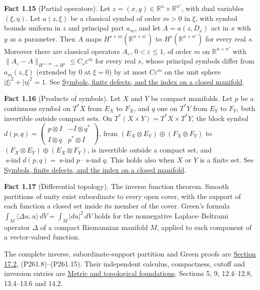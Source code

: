 \documentclass[
  11pt,
]{article}
\begin{document}
\textbf{Fact 1.15} (Partial operators). Let
\(z=(x,y)\in\mathbb R^n\times\mathbb R^{n'}\), with dual variables
\((\xi,\eta)\). Let \(a(z,\xi)\) be a classical symbol of order \(m>0\)
in \(\xi\), with symbol bounds uniform in \(z\) and principal part
\(a_m\), and let \(A=a(z,D_x)\) act in \(x\) with \(y\) as a parameter.
Then \(A\) maps \(H^{s+m}(\mathbb R^{n+n'})\) to
\(H^s(\mathbb R^{n+n'})\) for every real \(s\). Moreover there are
classical operators \(A_\varepsilon\), \(0<\varepsilon\le1\), of order
\(m\) on \(\mathbb R^{n+n'}\) with
\(\|A_\varepsilon-A\|_{H^{s+m}\to H^s}\le C_s\varepsilon^m\) for every
real \(s\), whose principal symbols differ from \(a_m(z,\xi)\) (extended
by \(0\) at \(\xi=0\)) by at most \(C\varepsilon^m\) on the unit sphere
\(|\xi|^2+|\eta|^2=1\). See
\href{global-elliptic-symbol-index.pdf}{Symbols, finite defects, and the
index on a closed manifold}.

\textbf{Fact 1.16} (Products of symbols). Let \(X\) and \(Y\) be compact
manifolds. Let \(p\) be a continuous symbol on \(T^*X\) from \(E_X\) to
\(F_X\), and \(q\) one on \(T^*Y\) from \(E_Y\) to \(F_Y\), both
invertible outside compact sets. On \(T^*(X\times Y)=T^*X\times T^*Y\),
the block symbol
\(d(p,q)=\begin{pmatrix}p\otimes I&-I\otimes q^*\\ I\otimes q&p^*\otimes I\end{pmatrix}\),
from \((E_X\otimes E_Y)\oplus(F_X\otimes F_Y)\) to
\((F_X\otimes E_Y)\oplus(E_X\otimes F_Y)\), is invertible outside a
compact set, and
\(\operatorname{s-ind}d(p,q)=\operatorname{s-ind}p\cdot\operatorname{s-ind}q\).
This holds also when \(X\) or \(Y\) is a finite set. See
\href{global-elliptic-symbol-index.pdf}{Symbols, finite defects, and the
index on a closed manifold}.

\textbf{Fact 1.17} (Differential topology). The inverse function
theorem. Smooth partitions of unity exist subordinate to every open
cover, with the support of each function a closed set inside its member
of the cover. Green's formula
\(\int_M\langle\Delta u,u\rangle\,dV=\int_M|du|^2\,dV\) holds for the
nonnegative Laplace--Beltrami operator \(\Delta\) of a compact
Riemannian manifold \(M\), applied to each component of a vector-valued
function.

The complete inverse, subordinate-support partition and Green proofs are
\hyperref[AN03-BOTT-P261-2]{Section 17.2}, (P261.8)--(P261.15). Their
independent calculus, compactness, cutoff and inversion entries are
\href{metric-foundation-bridges.pdf}{Metric and topological foundations},
Sections 5, 9, 12.4--12.8, 13.4--13.6 and 14.2.
\end{document}
